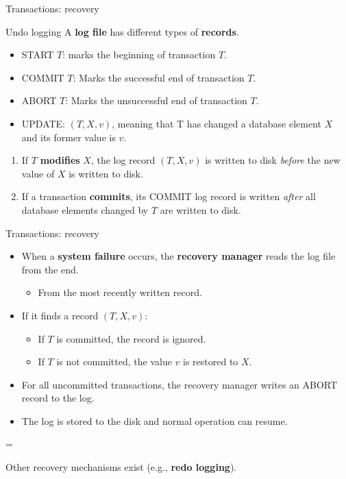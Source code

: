 \documentclass[xcolor=table]{beamer}
\newenvironment{warning}
  {\par\begin{mdframed}[linewidth=2pt,linecolor=darkred]%
    \begin{list}{}{\leftmargin=1cm
                   \labelwidth=\leftmargin}\item[\Large\ding{43}]}
  {\end{list}\end{mdframed}\par}
\begin{document}
  \begin{frame}{Transactions: recovery}
    \begin{block}{Undo logging}
      A {\bf log file} has different types of {\bf records}.
      \begin{itemize}
        \item START $T$: marks the beginning of transaction $T$.
        \item COMMIT $T$: Marks the successful end of transaction $T$.
        \item ABORT $T$: Marks the unsuccessful end of transaction $T$.
        \item UPDATE: $(T, X, v)$, meaning that T has changed a database element $X$ and 
        its former  value is $v$.
      \end{itemize}
    \end{block}
    \vfill
    \begin{enumerate}
      \item If $T$ {\bf modifies} $X$, the log record 
      $(T, X, v)$ is written to disk 
      {\em before} the new value of $X$ is written to disk.
      \item If a transaction {\bf commits}, its COMMIT log record 
      is written {\em after} all database elements changed by $T$
      are written to disk.
    \end{enumerate}
  \end{frame}

  \begin{frame}{Transactions: recovery}
    \begin{itemize}
      \item When a {\bf system failure} occurs, the {\bf recovery manager}
      reads the log file from the end.
      \begin{itemize}
        \item From the most recently written record.
      \end{itemize}
      \vfill
      \item If it finds a record $(T, X, v)$:
      \begin{itemize}
        \item If $T$ is committed, the record is ignored.
        \item If $T$ is not committed, the value $v$ is restored to $X$.
      \end{itemize}
      \vfill
      \item For all uncommitted transactions, the recovery manager 
      writes an ABORT record to the log.
      \vfill
      \item The log is stored to the disk and normal operation can resume.
    \end{itemize}
    \vfill
    \begin{warning}
        Other recovery mechanisms exist (e.g., {\bf redo logging}).
    \end{warning}
  \end{frame}
\end{document}
